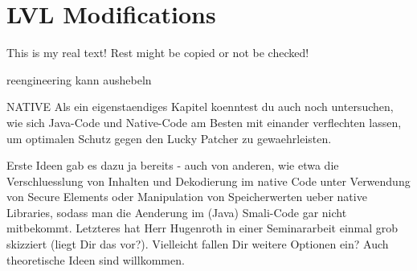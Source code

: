 \section{LVL Modifications} \label{section:evaluation-modifications}
This is my real text! Rest might be copied or not be checked!


reengineering kann aushebeln


NATIVE
Als ein eigenstaendiges Kapitel koenntest du auch noch untersuchen, wie sich Java-Code und Native-Code am Besten mit einander verflechten lassen, um optimalen Schutz gegen den Lucky Patcher zu gewaehrleisten.


Erste Ideen gab es dazu ja bereits - auch von anderen, wie etwa die Verschluesslung von Inhalten und Dekodierung im native Code unter Verwendung von Secure Elements oder Manipulation von Speicherwerten ueber native Libraries, sodass man die Aenderung im (Java) Smali-Code gar nicht mitbekommt. Letzteres hat Herr Hugenroth in einer Seminararbeit einmal grob skizziert (liegt Dir das vor?). Vielleicht fallen Dir weitere Optionen ein? Auch theoretische Ideen sind willkommen.
